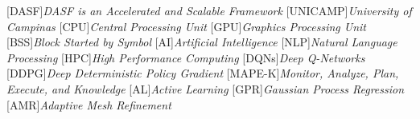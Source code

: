 [DASF]{\emph{DASF is an Accelerated and Scalable Framework}}
[UNICAMP]{\emph{University of Campinas}}
[CPU]{\emph{Central Processing Unit}}
[GPU]{\emph{Graphics Processing Unit}}
[BSS]{\emph{Block Started by Symbol}}
[AI]{\emph{Artificial Intelligence}}
[NLP]{\emph{Natural Language Processing}}
[HPC]{\emph{High Performance Computing}}
[DQNs]{\emph{Deep Q-Networks}}
[DDPG]{\emph{Deep Deterministic Policy Gradient}}
[MAPE-K]{\emph{Monitor, Analyze, Plan, Execute, and Knowledge}}
[AL]{\emph{Active Learning}}
[GPR]{\emph{Gaussian Process Regression}}
[AMR]{\emph{Adaptive Mesh Refinement}}
